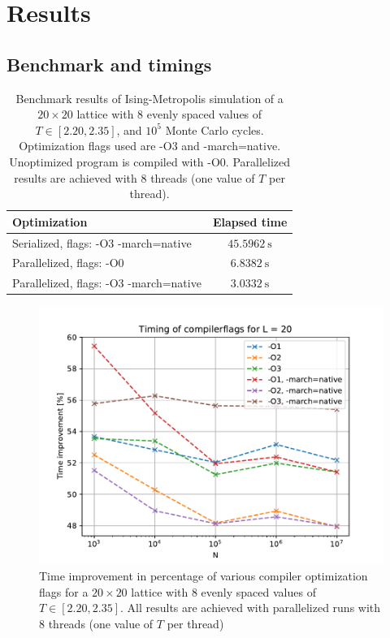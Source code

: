 \documentclass[reprint,english,notitlepage]{revtex4-1}  %
\begin{document}
\newpage

\section{Results} \label{sec:IV}

\subsection{Benchmark and timings} \label{sec:IV:}
\begin{table}[H]
	\centering
	\begin{tabular}{|l|c|}
		\hline
		Optimization & Elapsed time \\
		\hline
		Serialized, flags: -O3 -march=native & \(\SI{45.5962}{\second}\) \\
		Parallelized, flags: -O0 & \(\SI{6.8382}{\second}\) \\
		Parallelized, flags: -O3 -march=native & \(\SI{3.0332}{\second}\) \\
		\hline
	\end{tabular}
	\label{table:benchmark_parallel}
	\caption{Benchmark results of Ising-Metropolis simulation of a \(20\times 20\) lattice with \(8\) evenly spaced values of \(T \in [2.20, 2.35]\), and \(10^{5}\) Monte Carlo cycles. Optimization flags used are -O3 and -march=native. Unoptimized program is compiled with -O0. Parallelized results are achieved with \(8\) threads (one value of \(T\) per thread).}
\end{table}

\begin{figure}[H]
	\centering
	\includegraphics[width=\columnwidth]{../data/benchmark.pdf}
	\caption{Time improvement in percentage of various compiler optimization flags for a \(20\times 20\) lattice with \(8\) evenly spaced values of \(T \in [2.20, 2.35]\). All results are achieved with parallelized runs with \(8\) threads (one value of \(T\) per thread)}
\end{figure}
\end{document}
